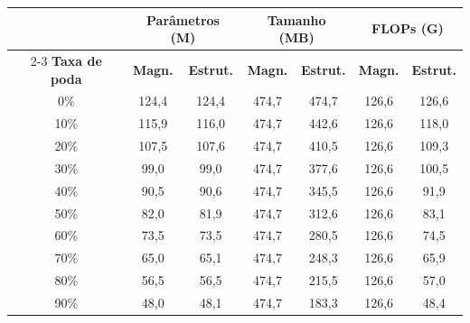 \begin{tabular}{c cc cc cc}
\hline
& \multicolumn{2}{c}{\textbf{Parâmetros (M)}} & \multicolumn{2}{c}{\textbf{Tamanho (MB)}} & \multicolumn{2}{c}{\textbf{FLOPs (G)}} \\
\cline{2-3} \cline{4-5} \cline{6-7}
\textbf{Taxa de poda} & \textbf{Magn.} & \textbf{Estrut.} & \textbf{Magn.} & \textbf{Estrut.} & \textbf{Magn.} & \textbf{Estrut.} \\
\hline
0\% & 124,4 & 124,4 & 474,7 & 474,7 & 126,6 & 126,6 \\
10\% & 115,9 & 116,0 & 474,7 & 442,6 & 126,6 & 118,0 \\
20\% & 107,5 & 107,6 & 474,7 & 410,5 & 126,6 & 109,3 \\
30\% & 99,0 & 99,0 & 474,7 & 377,6 & 126,6 & 100,5 \\
40\% & 90,5 & 90,6 & 474,7 & 345,5 & 126,6 & 91,9 \\
50\% & 82,0 & 81,9 & 474,7 & 312,6 & 126,6 & 83,1 \\
60\% & 73,5 & 73,5 & 474,7 & 280,5 & 126,6 & 74,5 \\
70\% & 65,0 & 65,1 & 474,7 & 248,3 & 126,6 & 65,9 \\
80\% & 56,5 & 56,5 & 474,7 & 215,5 & 126,6 & 57,0 \\
90\% & 48,0 & 48,1 & 474,7 & 183,3 & 126,6 & 48,4 \\
\hline
\end{tabular}
